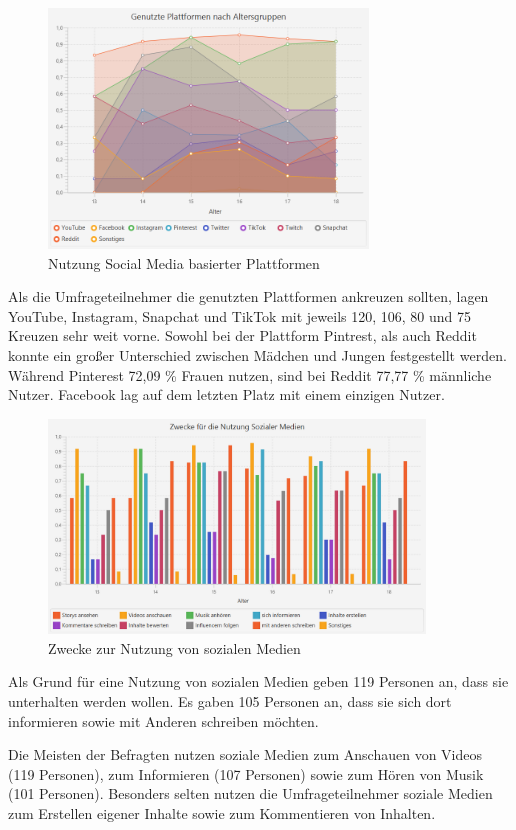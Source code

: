 \begin{figure}[ht]
    \centering
    \includegraphics[width=8.5cm]{image/Diagramm Genutzte Plattformen.png}
    \caption{\label{imgs:diagramm_plattformen_datenwerte}Nutzung Social Media basierter Plattformen}
\end{figure}

Als die Umfrageteilnehmer die genutzten Plattformen ankreuzen sollten, lagen YouTube, Instagram, Snapchat und TikTok mit jeweils 120, 106, 80 und 75 Kreuzen 
sehr weit vorne. Sowohl bei der Plattform Pintrest, als auch Reddit konnte ein großer Unterschied zwischen Mädchen und Jungen 
festgestellt werden. Während Pinterest 72,09 \% Frauen nutzen, sind bei Reddit 77,77 \% männliche Nutzer. Facebook lag auf dem letzten
Platz mit einem einzigen Nutzer.

\begin{figure}[h]
    \centering
    \includegraphics[width=10cm]{image/Diagramm Zwecke der Nutzung.png}
    \caption{\label{imgs:diagramm_zwecke_datenwerte}Zwecke zur Nutzung von sozialen Medien}
\end{figure}

Als Grund für eine Nutzung von sozialen Medien geben 119 Personen an, dass sie unterhalten werden wollen. Es gaben 105 Personen an, 
dass sie sich dort informieren sowie mit Anderen schreiben möchten.

Die Meisten der Befragten nutzen soziale Medien zum Anschauen von Videos (119 Personen), zum Informieren (107 Personen) sowie zum 
Hören von Musik (101 Personen). Besonders selten nutzen die Umfrageteilnehmer soziale Medien zum Erstellen eigener Inhalte 
sowie zum Kommentieren von Inhalten.


